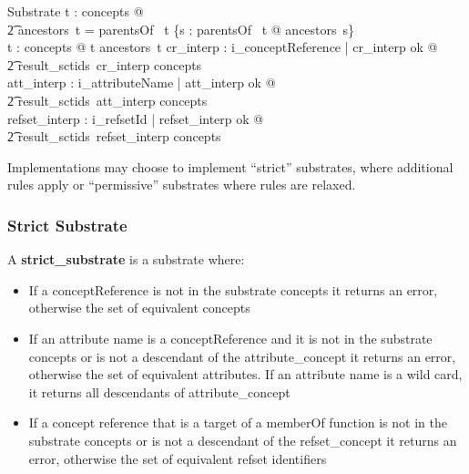 \documentclass{article}
\begin{document}
\begin{schema}{Substrate}
   \forall t : concepts @ \\
\t2 ancestors~t = parentsOf~ t \cup \bigcup \{s : parentsOf~ t @ ancestors~s\} \\
   \forall t : concepts @ t \notin ancestors~t
\also
   \forall cr\_interp : \ran i\_conceptReference | cr\_interp \in \ran ok @ \\
\t2 result\_sctids~cr\_interp \subseteq concepts \\
   \forall att\_interp : \ran i\_attributeName | att\_interp \in \ran ok @ \\
\t2 result\_sctids~att\_interp \subseteq concepts \\
   \forall refset\_interp : \ran i\_refsetId | refset\_interp \in \ran ok @ \\
\t2 result\_sctids~refset\_interp \subseteq concepts 
\end{schema}

Implementations may choose to implement ``strict'' substrates, where additional rules apply or ``permissive'' substrates where rules are relaxed.
\subsubsection{Strict Substrate}
A \textbf{strict\_substrate} is a substrate where:
\begin{itemize}[noitemsep,nolistsep]
\item If a conceptReference is not in the substrate concepts it returns an error, otherwise the set of equivalent concepts
\item If an attribute name is a conceptReference and it is not in the substrate concepts or is not a descendant of the attribute\_concept it returns an error, otherwise the set of equivalent attributes.  If an
attribute name is a wild card, it returns all descendants of attribute\_concept
\item If a concept reference that is a target of a memberOf function is not in the substrate concepts or is not a descendant of the refset\_concept it returns an error, otherwise the set of equivalent refset identifiers
\end{itemize}
\end{document}
